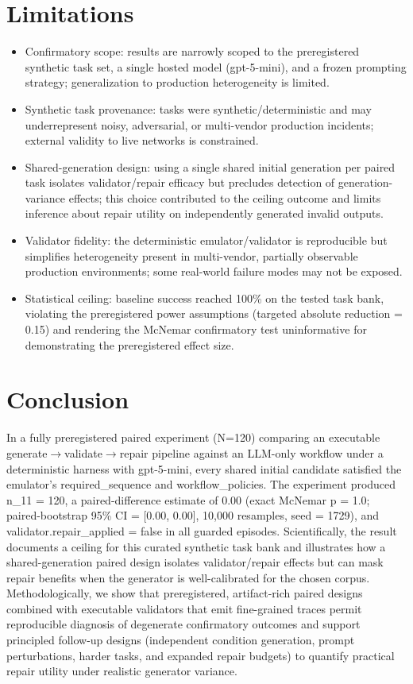 \documentclass[conference]{IEEEtran}
\begin{document}
\section{Limitations}
\begin{itemize}
\item Confirmatory scope: results are narrowly scoped to the preregistered synthetic task set, a single hosted model (gpt-5-mini), and a frozen prompting strategy; generalization to production heterogeneity is limited.
\item Synthetic task provenance: tasks were synthetic/deterministic and may underrepresent noisy, adversarial, or multi-vendor production incidents; external validity to live networks is constrained.
\item Shared-generation design: using a single shared initial generation per paired task isolates validator/repair efficacy but precludes detection of generation-variance effects; this choice contributed to the ceiling outcome and limits inference about repair utility on independently generated invalid outputs.
\item Validator fidelity: the deterministic emulator/validator is reproducible but simplifies heterogeneity present in multi-vendor, partially observable production environments; some real-world failure modes may not be exposed.
\item Statistical ceiling: baseline success reached 100\% on the tested task bank, violating the preregistered power assumptions (targeted absolute reduction = 0.15) and rendering the McNemar confirmatory test uninformative for demonstrating the preregistered effect size.
\end{itemize}

\section{Conclusion}
In a fully preregistered paired experiment (N=120) comparing an executable generate\ensuremath{\rightarrow}validate\ensuremath{\rightarrow}repair pipeline against an LLM-only workflow under a deterministic harness with gpt-5-mini, every shared initial candidate satisfied the emulator's required\_sequence and workflow\_policies. The experiment produced n\_11 = 120, a paired-difference estimate of 0.00 (exact McNemar p = 1.0; paired-bootstrap 95\% CI = [0.00, 0.00], 10,000 resamples, seed = 1729), and validator.repair\_applied = false in all guarded episodes. Scientifically, the result documents a ceiling for this curated synthetic task bank and illustrates how a shared-generation paired design isolates validator/repair effects but can mask repair benefits when the generator is well-calibrated for the chosen corpus. Methodologically, we show that preregistered, artifact-rich paired designs combined with executable validators that emit fine-grained traces permit reproducible diagnosis of degenerate confirmatory outcomes and support principled follow-up designs (independent condition generation, prompt perturbations, harder tasks, and expanded repair budgets) to quantify practical repair utility under realistic generator variance.
\end{document}
